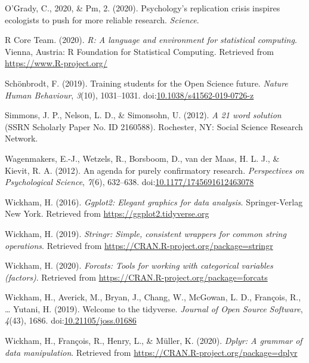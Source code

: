 \documentclass[
  man,mask,floatsintext]{apa6}
\newlength{\cslhangindent}
\newenvironment{cslreferences}%
  {\setlength{\parindent}{0pt}%
  \everypar{\setlength{\hangindent}{\cslhangindent}}\ignorespaces}%
  {\par}
\begin{document}
\begin{cslreferences}
\leavevmode\hypertarget{ref-ogradyPsychologyReplicationCrisis2020}{}%
O'Grady, C., 2020, \& Pm, 2. (2020). Psychology's replication crisis inspires ecologists to push for more reliable research. \emph{Science}.

\leavevmode\hypertarget{ref-R-base}{}%
R Core Team. (2020). \emph{R: A language and environment for statistical computing}. Vienna, Austria: R Foundation for Statistical Computing. Retrieved from \url{https://www.R-project.org/}

\leavevmode\hypertarget{ref-schonbrodtTrainingStudentsOpen2019}{}%
Schönbrodt, F. (2019). Training students for the Open Science future. \emph{Nature Human Behaviour}, \emph{3}(10), 1031--1031. doi:\href{https://doi.org/10.1038/s41562-019-0726-z}{10.1038/s41562-019-0726-z}

\leavevmode\hypertarget{ref-simmons21WordSolution2012}{}%
Simmons, J. P., Nelson, L. D., \& Simonsohn, U. (2012). \emph{A 21 word solution} (SSRN Scholarly Paper No. ID 2160588). Rochester, NY: Social Science Research Network.

\leavevmode\hypertarget{ref-wagenmakersAgendaPurelyConfirmatory2012}{}%
Wagenmakers, E.-J., Wetzels, R., Borsboom, D., van der Maas, H. L. J., \& Kievit, R. A. (2012). An agenda for purely confirmatory research. \emph{Perspectives on Psychological Science}, \emph{7}(6), 632--638. doi:\href{https://doi.org/10.1177/1745691612463078}{10.1177/1745691612463078}

\leavevmode\hypertarget{ref-R-ggplot2}{}%
Wickham, H. (2016). \emph{Ggplot2: Elegant graphics for data analysis}. Springer-Verlag New York. Retrieved from \url{https://ggplot2.tidyverse.org}

\leavevmode\hypertarget{ref-R-stringr}{}%
Wickham, H. (2019). \emph{Stringr: Simple, consistent wrappers for common string operations}. Retrieved from \url{https://CRAN.R-project.org/package=stringr}

\leavevmode\hypertarget{ref-R-forcats}{}%
Wickham, H. (2020). \emph{Forcats: Tools for working with categorical variables (factors)}. Retrieved from \url{https://CRAN.R-project.org/package=forcats}

\leavevmode\hypertarget{ref-R-tidyverse}{}%
Wickham, H., Averick, M., Bryan, J., Chang, W., McGowan, L. D., François, R., \ldots{} Yutani, H. (2019). Welcome to the tidyverse. \emph{Journal of Open Source Software}, \emph{4}(43), 1686. doi:\href{https://doi.org/10.21105/joss.01686}{10.21105/joss.01686}

\leavevmode\hypertarget{ref-R-dplyr}{}%
Wickham, H., François, R., Henry, L., \& Müller, K. (2020). \emph{Dplyr: A grammar of data manipulation}. Retrieved from \url{https://CRAN.R-project.org/package=dplyr}


\end{cslreferences}
\end{document}
